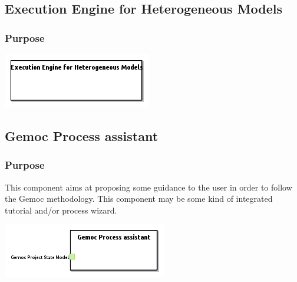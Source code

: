 \documentclass{gemoc} %
\begin{document}
\subsection{Execution Engine for Heterogeneous Models}


\subsubsection{Purpose}


\begin{center}
\includegraphics*[trim=0.0cm 0.0cm 0cm 0.0cm, clip=true]{../images/generated/Generated_Execution_Engine_for_Heterogeneous_Models.png}
\end{center}




\subsection{Gemoc Process assistant}


\subsubsection{Purpose}
This component aims at proposing some guidance to the user in order to follow the Gemoc methodology. This component may be some kind of integrated tutorial and/or process wizard.

\begin{center}
\includegraphics*[trim=0.0cm 0.0cm 0cm 0.0cm, clip=true]{../images/generated/Generated_Gemoc_Process_assistant.png}
\end{center}
\end{document}
